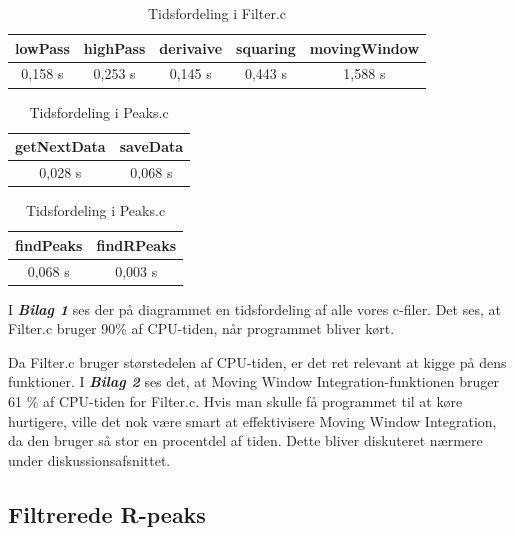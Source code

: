 \documentclass{article}
\begin{document}
\begin{table}[h]
	\centering
	\caption{Tidsfordeling i Filter.c}
	\begin{tabular}{|c|c|c|c|c|}
	\hline
	lowPass & highPass & derivaive & squaring & movingWindow \\ \hline
	0,158 s & 0,253 s & 0,145 s & 0,443 s & 1,588 s \\ \hline
	\end{tabular}
\end{table}
\begin{table}[h]
	\begin{minipage}{.5\linewidth}
		\centering
		\caption{Tidsfordeling i Sensor.c}
		\begin{tabular}{|c|c|}
		\hline
		getNextData & saveData\\ \hline
		0,028 s & 0,068 s \\ \hline
		\end{tabular}
	\end{minipage}%
	\begin{minipage}{.5\linewidth}
		\centering
		\caption{Tidsfordeling i Peaks.c}
		\begin{tabular}{|c|c|}
		\hline
		findPeaks & findRPeaks \\ \hline
		0,068 s & 0,003 s \\ \hline
		\end{tabular}
	\end{minipage}
\end{table}

I \textbf{\textit{Bilag 1}} ses der på diagrammet en tidsfordeling af alle vores c-filer. Det ses, at Filter.c bruger 90\% af CPU-tiden, når programmet bliver kørt. 

Da Filter.c bruger størstedelen af CPU-tiden, er det ret relevant at kigge på dens funktioner. I \textbf{\textit{Bilag 2}} ses det, at Moving Window Integration-funktionen bruger 61 \% af CPU-tiden for Filter.c. Hvis man skulle få programmet til at køre hurtigere, ville det nok være smart at effektivisere Moving Window Integration, da den bruger så stor en procentdel af tiden. Dette bliver diskuteret nærmere under diskussionsafsnittet.

\subsection{Filtrerede R-peaks}
\end{document}
